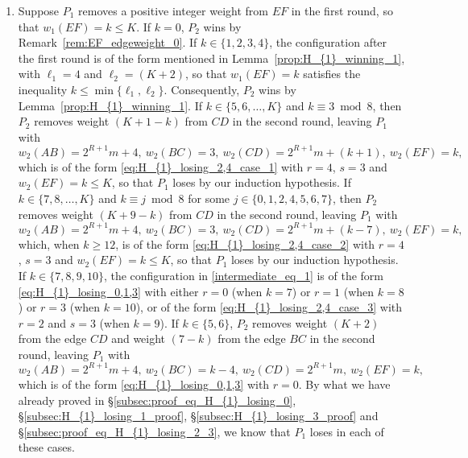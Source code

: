 \documentclass[11pt,reqno]{amsart}
\theoremstyle{definition}
\theoremstyle{definition}
\begin{document}
\begin{enumerate}
\item Suppose $P_{1}$ removes a positive integer weight from $EF$ in the first round, so that $w_{1}(EF)=k \leqslant K$. If $k=0$, $P_{2}$ wins by Remark~\ref{rem:EF_edgeweight_0}. If $k\in\{1,2,3,4\}$, the configuration after the first round is of the form mentioned in Lemma~\ref{prop:H_{1}_winning_1}, with $\ell_{1}=4$ and $\ell_{2}=(K+2)$, so that $w_{1}(EF)=k$ satisfies the inequality $k \leqslant \min\{\ell_{1},\ell_{2}\}$. Consequently, $P_{2}$ wins by Lemma~\ref{prop:H_{1}_winning_1}. If $k \in \{5,6,\ldots,K\}$ and $k \equiv 3 \bmod 8$, then $P_{2}$ removes weight $(K+1-k)$ from $CD$ in the second round, leaving $P_{1}$ with
\begin{equation}
w_{2}(AB)=2^{R+1}m+4,\ w_{2}(BC)=3,\ w_{2}(CD)=2^{R+1}m+(k+1),\ w_{2}(EF)=k,\nonumber
\end{equation}
which is of the form \eqref{eq:H_{1}_losing_2,4_case_1} with $r=4$, $s=3$ and $w_{2}(EF)=k\leqslant K$, so that $P_{1}$ loses by our induction hypothesis. If $k \in\{7,8,\ldots,K\}$ and $k \equiv j \bmod 8$ for some $j \in \{0,1,2,4,5,6,7\}$, then $P_{2}$ removes weight $(K+9-k)$ from $CD$ in the second round, leaving $P_{1}$ with
\begin{equation}
w_{2}(AB)=2^{R+1}m+4,\ w_{2}(BC)=3,\ w_{2}(CD)=2^{R+1}m+(k-7),\ w_{2}(EF)=k,\label{intermediate_eq_1}
\end{equation}
which, when $k\geqslant 12$, is of the form \eqref{eq:H_{1}_losing_2,4_case_2} with $r=4$, $s=3$ and $w_{2}(EF)=k\leqslant K$, so that $P_{1}$ loses by our induction hypothesis. If $k \in \{7,8,9,10\}$, the configuration in \eqref{intermediate_eq_1} is of the form \eqref{eq:H_{1}_losing_0,1,3} with either $r=0$ (when $k=7$) or $r=1$ (when $k=8$) or $r=3$ (when $k=10$), or of the form \eqref{eq:H_{1}_losing_2,4_case_3} with $r=2$ and $s=3$ (when $k=9$). If $k\in\{5,6\}$, $P_{2}$ removes weight $(K+2)$ from the edge $CD$ and weight $(7-k)$ from the edge $BC$ in the second round, leaving $P_{1}$ with
\begin{equation}
w_{2}(AB)=2^{R+1}m+4,\ w_{2}(BC)=k-4,\ w_{2}(CD)=2^{R+1}m,\ w_{2}(EF)=k,\nonumber
\end{equation}
which is of the form \eqref{eq:H_{1}_losing_0,1,3} with $r=0$. By what we have already proved in \S\ref{subsec:proof_eq_H_{1}_losing_0}, \S\ref{subsec:H_{1}_losing_1_proof}, \S\ref{subsec:H_{1}_losing_3_proof} and \S\ref{subsec:proof_eq_H_{1}_losing_2_3}, we know that $P_{1}$ loses in each of these cases.


\end{enumerate}
\end{document}
